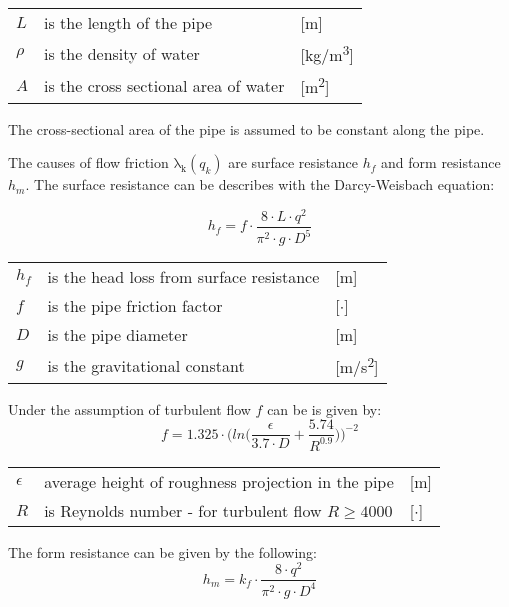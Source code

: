 	\begin{center}
		\begin{tabular}{l p{10cm} l}
			$L$ & is the length of the pipe & [\si{m}]\\
			$\rho$ & is the density of water & [\si{kg}/\si{m\cubed}]\\  
			$A$ & is the cross sectional area of water & [\si{m\squared}]\\ 
		\end{tabular}
	\end{center}
The cross-sectional area of the pipe is assumed to be constant along the pipe.

The causes of flow friction $\mathrm{\lambda_{k}}(q_{k})$ are surface resistance $h_{f}$ and form resistance $h_{m}$. The surface resistance can be describes with the Darcy-Weisbach equation:

\begin{equation}
	h_{f} = f \cdot \frac{8\cdot L\cdot q^{2}}{\pi^{2}\cdot g \cdot D^{5}}
\end{equation} 

\begin{center}
	\begin{tabular}{l p{10cm} l}
		$h_{f}$ & is the head loss from surface resistance & [\si{m}]\\
		$f$ & is the pipe friction factor & [$\cdot$]\\
		$D$ & is the pipe diameter & [\si{m}]\\
		$g$ & is the gravitational constant & [\si{m}/\si{s\squared}]\\
	\end{tabular}
\end{center}
Under the assumption of turbulent flow $f$ can be is given by:
\begin{equation}
	f=1.325\cdot \Bigg(ln\Big(\frac{\epsilon}{3.7 \cdot D}+\frac{5.74}{R^{0.9}}\Big)\Bigg)^{-2}
\end{equation}

\begin{center}
	\begin{tabular}{l p{8cm} l}
		$\epsilon$ & average height of roughness projection in the pipe & [\si{m}]\\
		$R$ &  is Reynolds number - for turbulent ﬂow $R \geq 4000$ & [$\cdot$]\\
	\end{tabular}
\end{center}

The form resistance can be given by the following:
\begin{equation}
	h_{m}=k_{f}\cdot \frac{8\cdot q^{2}}{\pi^{2}\cdot g \cdot D^{4}}
\end{equation}

